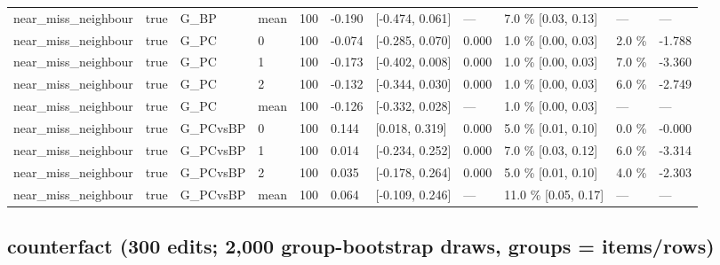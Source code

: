 \documentclass[10pt,a4paper]{article}
\begin{document}
\begin{center}
\begin{tabularx}{\textwidth}{@{}p{}XXXXXXXXXX@{}}
near\_miss\_neighbour & true & G\_BP & mean & 100 & -0.190 & [-0.474, 0.061] & — & 7.0 \% [0.03, 0.13] & — & — \\
near\_miss\_neighbour & true & G\_PC & 0 & 100 & -0.074 & [-0.285, 0.070] & 0.000 & 1.0 \% [0.00, 0.03] & 2.0 \% & -1.788 \\
near\_miss\_neighbour & true & G\_PC & 1 & 100 & -0.173 & [-0.402, 0.008] & 0.000 & 1.0 \% [0.00, 0.03] & 7.0 \% & -3.360 \\
near\_miss\_neighbour & true & G\_PC & 2 & 100 & -0.132 & [-0.344, 0.030] & 0.000 & 1.0 \% [0.00, 0.03] & 6.0 \% & -2.749 \\
near\_miss\_neighbour & true & G\_PC & mean & 100 & -0.126 & [-0.332, 0.028] & — & 1.0 \% [0.00, 0.03] & — & — \\
near\_miss\_neighbour & true & G\_PCvsBP & 0 & 100 & 0.144 & [0.018, 0.319] & 0.000 & 5.0 \% [0.01, 0.10] & 0.0 \% & -0.000 \\
near\_miss\_neighbour & true & G\_PCvsBP & 1 & 100 & 0.014 & [-0.234, 0.252] & 0.000 & 7.0 \% [0.03, 0.12] & 6.0 \% & -3.314 \\
near\_miss\_neighbour & true & G\_PCvsBP & 2 & 100 & 0.035 & [-0.178, 0.264] & 0.000 & 5.0 \% [0.01, 0.10] & 4.0 \% & -2.303 \\
near\_miss\_neighbour & true & G\_PCvsBP & mean & 100 & 0.064 & [-0.109, 0.246] & — & 11.0 \% [0.05, 0.17] & — & — \\
\bottomrule
\end{tabularx}
\end{center}



\subsection*{counterfact (300 edits; 2,000 group-bootstrap draws, groups = items/rows)}
\end{document}
